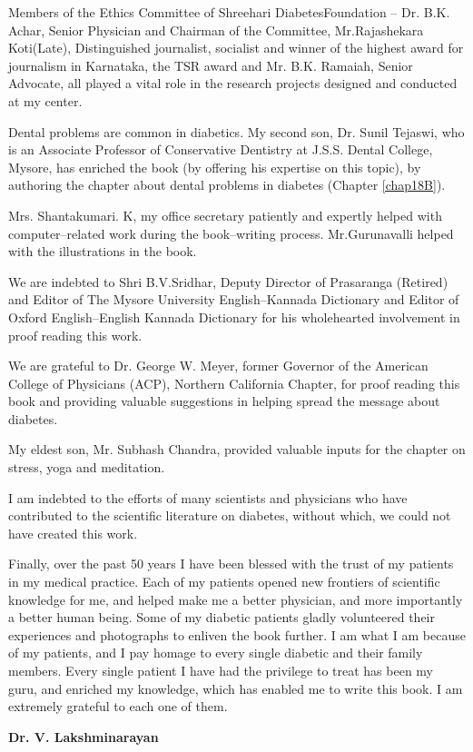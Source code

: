 Members of the Ethics Committee of Shreehari Diabetes\break Foundation – Dr. B.K. Achar, Senior Physician and Chairman of the Committee, Mr.Rajashekara Koti(Late), Distinguished journa\-list, socia\-list and winner of the highest award for journalism in Karnataka, the TSR award and Mr. B.K. Ramaiah, Senior Advocate, all played a vital role in the research projects designed and conducted at my center.

Dental problems are common in diabetics. My second son, Dr. Sunil Tejaswi, who is an Associate Professor of Conservative Dentistry at J.S.S. Dental College, Mysore, has enriched the book (by offering his expertise on this topic), by authoring the chapter about dental problems in diabetes (Chapter \ref{chap18B}).

Mrs. Shantakumari. K, my office secretary patiently and expertly helped with computer–related work during the book–writing process. Mr.Gurunavalli helped with the illustrations in the book.

We are indebted to Shri B.V.Sridhar, Deputy Director of Prasaranga (Retired) and Editor of The Mysore University English–Kannada Dictionary and Editor of Oxford English–English Kannada Dictionary for his wholehearted involvement in proof reading this work.

We are grateful to Dr. George W. Meyer, former Governor of the American College of Physicians (ACP), Northern California Chapter, for proof reading this book and providing valuable suggestions in helping spread the message about diabetes.

My eldest son, Mr. Subhash Chandra, provided valuable inputs for the chapter on stress, yoga and meditation.

I am indebted to the efforts of many scientists and physicians who have contributed to the scientific literature on diabetes, without which, we could not have created this work.

Finally, over the past 50 years I have been blessed with the trust of my patients in my medical practice. Each of my patients opened new frontiers of scientific knowledge for me, and helped make me a better physician, and more importantly a better human being. Some of my dia\-betic patients gladly volunteered their experiences and photographs to enliven the book further. I am what I am because of my patients, and I pay homage to every single diabetic and their family members. Every single patient I have had the privilege to treat has been my guru, and enriched my knowledge, which has enabled me to write this book. I am extremely grateful to each one of them.

\begin{flushright}
\textbf{Dr. V. Lakshminarayan}
\end{flushright}

